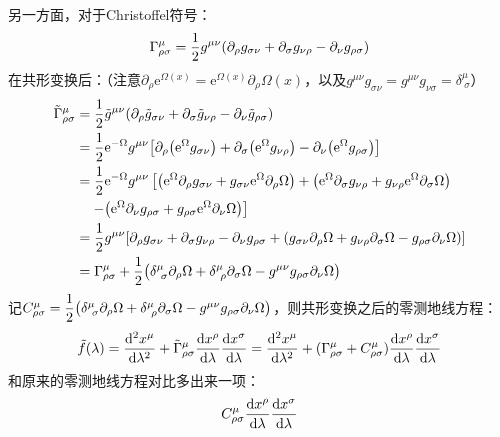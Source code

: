 \documentclass[a4paper]{article}
\begin{document}
\begin{enumerate}
    另一方面，对于Christoffel符号：
    \[
        \Gamma^\mu_{\rho\sigma} = \frac{1}{2} g^{\mu\nu} \qty(\partial_\rho g_{\sigma\nu} + \partial_\sigma g_{\nu\rho} - \partial_\nu g_{\rho\sigma})
    \]
    在共形变换后：（注意$\partial_\rho \mathrm{e}^{\Omega(x)} = \mathrm{e}^{\Omega(x)} \partial_\rho \Omega(x)$，以及$g^{\mu\nu} g_{\sigma\nu} = g^{\mu\nu} g_{\nu\sigma} = \delta^{\mu}_{\ \sigma}$）
    \begin{align*}
        \tilde{\Gamma}^\mu_{\rho\sigma}
        &= \frac{1}{2} \tilde{g}^{\mu\nu} \qty(\partial_\rho \tilde{g}_{\sigma\nu} + \partial_\sigma \tilde{g}_{\nu\rho} - \partial_\nu \tilde{g}_{\rho\sigma}) \\
        &= \frac{1}{2} \mathrm{e}^{-\Omega} g^{\mu\nu} \qty[\partial_\rho \qty(\mathrm{e}^\Omega {g}_{\sigma\nu}) + \partial_\sigma \qty(\mathrm{e}^\Omega {g}_{\nu\rho}) - \partial_\nu \qty(\mathrm{e}^\Omega {g}_{\rho\sigma})] \\
        &= \frac{1}{2} \mathrm{e}^{-\Omega} g^{\mu\nu} \left[\qty(\mathrm{e}^\Omega \partial_\rho {g}_{\sigma\nu} + {g}_{\sigma\nu} \mathrm{e}^\Omega \partial_\rho \Omega) + \qty(\mathrm{e}^\Omega \partial_\sigma {g}_{\nu\rho} + {g}_{\nu\rho} \mathrm{e}^\Omega \partial_\sigma \Omega)\right. \\
        &\quad \left. - \qty(\mathrm{e}^\Omega \partial_\nu {g}_{\rho\sigma} + {g}_{\rho\sigma} \mathrm{e}^\Omega \partial_\nu \Omega)\right] \\
        &= \frac{1}{2} g^{\mu\nu} \qty[\partial_\rho g_{\sigma\nu} + \partial_\sigma g_{\nu\rho} - \partial_\nu g_{\rho\sigma} + \qty(g_{\sigma\nu} \partial_\rho \Omega + g_{\nu\rho} \partial_\sigma \Omega - g_{\rho\sigma} \partial_\nu \Omega)] \\
        &= \Gamma^\mu_{\rho\sigma} + \frac{1}{2} \qty(\delta^\mu_{\ \sigma} \partial_\rho \Omega + \delta^\mu_{\ \rho} \partial_\sigma \Omega - g^{\mu\nu} g_{\rho\sigma} \partial_\nu \Omega)
    \end{align*}
    记$C^\mu_{\rho\sigma} = \dfrac{1}{2} \qty(\delta^\mu_{\ \sigma} \partial_\rho \Omega + \delta^\mu_{\ \rho} \partial_\sigma \Omega - g^{\mu\nu} g_{\rho\sigma} \partial_\nu \Omega)$，则共形变换之后的零测地线方程：
    \[
        \tilde{f}(\lambda) = \dv[2]{x^\mu}{\lambda} + \tilde{\Gamma}^\mu_{\rho\sigma} \dv{x^\rho}{\lambda} \dv{x^\sigma}{\lambda} = \dv[2]{x^\mu}{\lambda} + (\Gamma^\mu_{\rho\sigma} + C^\mu_{\rho\sigma}) \dv{x^\rho}{\lambda} \dv{x^\sigma}{\lambda}
    \]
    和原来的零测地线方程对比多出来一项：
    \[
        C^\mu_{\rho\sigma} \dv{x^\rho}{\lambda} \dv{x^\sigma}{\lambda}
\]
\end{enumerate}
\end{document}

